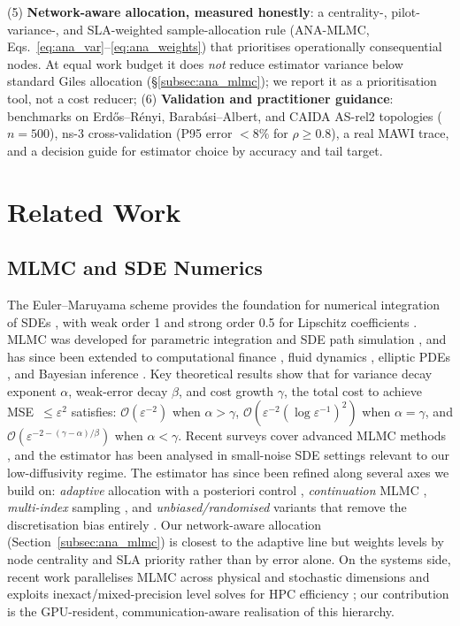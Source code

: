 \documentclass{ieeeaccess}
\begin{document}
(5) \textbf{Network-aware allocation, measured honestly}: a centrality-, pilot-variance-, and
SLA-weighted sample-allocation rule (ANA-MLMC, Eqs.~\eqref{eq:ana_var}--\eqref{eq:ana_weights})
that prioritises operationally consequential nodes. At equal work budget it does \emph{not}
reduce estimator variance below standard Giles allocation
(\S\ref{subsec:ana_mlmc}); we report it as a prioritisation tool, not a cost reducer;
(6) \textbf{Validation and practitioner guidance}: benchmarks on Erd\H{o}s--R\'enyi,
Barab\'{a}si--Albert, and CAIDA AS-rel2 topologies ($n{=}500$), ns-3 cross-validation
(P95 error $<8\%$ for $\rho\geq0.8$), a real MAWI trace, and a decision guide for estimator
choice by accuracy and tail target.

\section{Related Work}

\subsection{MLMC and SDE Numerics}

The Euler--Maruyama scheme provides the foundation for numerical integration of SDEs
\cite{kloeden1992}, with weak order 1 and strong order 0.5 for Lipschitz coefficients
\cite{khasminskii2012}. MLMC was developed for parametric integration
\cite{heinrich2001multilevel} and SDE path simulation \cite{giles2008multilevel}, and has since
been extended to computational finance \cite{giles2012finance,glasserman2003monte}, fluid
dynamics \cite{mishra2012sparse}, elliptic PDEs \cite{cliffe2015}, and Bayesian inference
\cite{dodwell2015hierarchical}. Key theoretical results \cite{giles2015multilevel} show that for variance decay exponent
$\alpha$, weak-error decay $\beta$, and cost growth $\gamma$, the total cost to achieve
MSE~$\leq\varepsilon^2$ satisfies: $\mathcal{O}(\varepsilon^{-2})$ when $\alpha>\gamma$,
$\mathcal{O}(\varepsilon^{-2}(\log\varepsilon^{-1})^2)$ when $\alpha=\gamma$, and
$\mathcal{O}(\varepsilon^{-2-(\gamma-\alpha)/\beta})$ when $\alpha<\gamma$.
Recent surveys cover advanced MLMC methods \cite{jasra2020advanced}, and the
estimator has been analysed in small-noise SDE settings
\cite{anderson2016small} relevant to our low-diffusivity regime.
The estimator has since been refined along several axes we build on: \emph{adaptive}
allocation with a posteriori control \cite{hoel2014adaptive}, \emph{continuation} MLMC
\cite{collier2015}, \emph{multi-index} sampling \cite{hajiali2016multiindex}, and
\emph{unbiased/randomised} variants that remove the discretisation bias entirely
\cite{rhee2015unbiased,vihola2018unbiased}. Our network-aware allocation (Section~\ref{subsec:ana_mlmc})
is closest to the adaptive line but weights levels by node centrality and SLA priority rather than
by error alone. On the systems side, recent work parallelises MLMC across physical and stochastic
dimensions \cite{litvinenko2023uncertainty} and exploits inexact/mixed-precision level solves for
HPC efficiency \cite{martinek2025inexact}; our contribution is the GPU-resident, communication-aware
realisation of this hierarchy.
\end{document}
